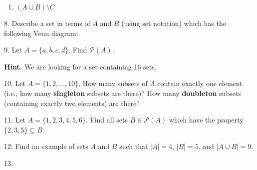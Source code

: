 \documentclass[10pt,]{book}
\newcommand{\terminology}[1]{\textbf{#1}}
\theoremstyle{plain}
\theoremstyle{definition}
\theoremstyle{definition}
\numberwithin{equation}{chapter}
\newcommand{\pow}{\mathcal P}
\begin{document}
\begin{exerciselist}
\begin{enumerate}[label=(\alph*)]
\item\hypertarget{li-361}{}\((A \cup B) \setminus C\)%
\end{enumerate}
%
\par\smallskip
\item[8.]\hypertarget{exercise-35}{}\hypertarget{p-532}{}%
Describe a set in terms of \(A\) and \(B\) (using set notation) which has the following Venn diagram:%
\begin{sidebyside}{1}{0.4}{0.4}{0}
\begin{sbspanel}{0.2}
\end{sbspanel}
\end{sidebyside}
\par\smallskip
\item[9.]\hypertarget{exercise-36}{}\hypertarget{p-533}{}%
Let \(A = \{a, b, c, d\}\). Find \(\pow(A)\).%
\par\smallskip
\par\smallskip%
\noindent\textbf{Hint.}\hypertarget{hint-3}{}\quad%
\hypertarget{p-534}{}%
We are looking for a set containing 16 sets.%
\item[10.]\hypertarget{exercise-37}{}\hypertarget{p-535}{}%
Let \(A = \{1,2,\ldots, 10\}\). How many subsets of \(A\) contain exactly one element (i.e., how many \terminology{singleton} subsets are there)? How many \terminology{doubleton} subsets (containing exactly two elements) are there?%
\par\smallskip
\item[11.]\hypertarget{exercise-38}{}\hypertarget{p-536}{}%
Let \(A = \{1,2,3,4,5,6\}\). Find all sets \(B \in \pow(A)\) which have the property \(\{2,3,5\} \subseteq B\).%
\par\smallskip
\item[12.]\hypertarget{exercise-39}{}\hypertarget{p-537}{}%
Find an example of sets \(A\) and \(B\) such that \(|A| = 4\), \(|B| = 5\), and \(|A \cup B| = 9\).%
\par\smallskip
\item[13.]\hypertarget{exercise-40}{}\hypertarget{p-539}{}%

\end{exerciselist}
\end{document}

